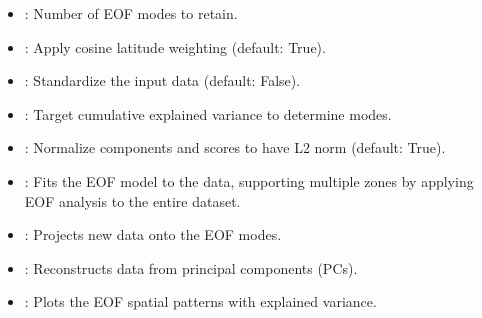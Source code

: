 \documentclass[letterpaper,10pt,english]{sphinxmanual}
\begin{document}
\sphinxAtStartPar
{}

\sphinxAtStartPar
{}
\begin{itemize}
\item {} 
\sphinxAtStartPar
{}: Number of EOF modes to retain.

\item {} 
\sphinxAtStartPar
{}: Apply cosine latitude weighting (default: True).

\item {} 
\sphinxAtStartPar
{}: Standardize the input data (default: False).

\item {} 
\sphinxAtStartPar
{}: Target cumulative explained variance to determine modes.

\item {} 
\sphinxAtStartPar
{}: Normalize components and scores to have L2 norm (default: True).

\end{itemize}

\sphinxAtStartPar
{}
\begin{itemize}
\item {} 
\sphinxAtStartPar
{}: Fits the EOF model to the data, supporting multiple zones by applying EOF analysis to the entire dataset.

\item {} 
\sphinxAtStartPar
{}: Projects new data onto the EOF modes.

\item {} 
\sphinxAtStartPar
{}: Reconstructs data from principal components (PCs).

\item {} 
\sphinxAtStartPar
{}: Plots the EOF spatial patterns with explained variance.

\end{itemize}

\sphinxAtStartPar
{}
\end{document}
